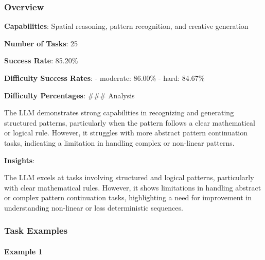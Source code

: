 \documentclass[fleqn,10pt]{wlscirep}
\begin{document}
\hypertarget{overview-17}{%
\subsubsection{Overview}\label{overview-17}}

\textbf{Capabilities}: Spatial reasoning, pattern recognition, and
creative generation

\textbf{Number of Tasks}: 25

\textbf{Success Rate}: 85.20\%

\textbf{Difficulty Success Rates}: - moderate: 86.00\% - hard: 84.67\%

\textbf{Difficulty Percentages}: \#\#\# Analysis

The LLM demonstrates strong capabilities in recognizing and generating
structured patterns, particularly when the pattern follows a clear
mathematical or logical rule. However, it struggles with more abstract
pattern continuation tasks, indicating a limitation in handling complex
or non-linear patterns.

\textbf{Insights}:

The LLM excels at tasks involving structured and logical patterns,
particularly with clear mathematical rules. However, it shows
limitations in handling abstract or complex pattern continuation tasks,
highlighting a need for improvement in understanding non-linear or less
deterministic sequences.

\hypertarget{task-examples-16}{%
\subsubsection{Task Examples}\label{task-examples-16}}

\hypertarget{example-1-16}{%
\paragraph{Example 1}\label{example-1-16}}
\end{document}
